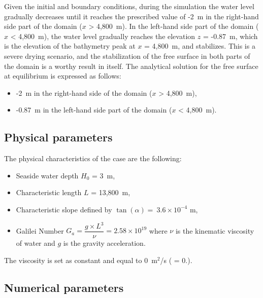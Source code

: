 Given the initial and boundary conditions, during the simulation
the water level gradually decreases until it reaches the prescribed value of -2~m
in the right-hand
side part of the domain ($x$ > 4,800~m). In the left-hand side
part of the domain ($x$ < 4,800~m), the water level gradually reaches the
elevation $z$ = -0.87~m, which
is the elevation of the bathymetry peak at $x$ = 4,800~m, and stabilizes.
This is a severe drying scenario,
and the stabilization of the free surface in both parts of the domain is a
worthy result in itself.
The analytical solution for the free surface at equilibrium is expressed as
follows:
\begin{itemize}
\item -2~m in the right-hand side of the domain ($x$ > 4,800~m),
\item -0.87~m in the left-hand side part of the domain ($x$ < 4,800~m).
\end{itemize}

\subsection{Physical parameters}

The physical characteristics of the case are the following:
\begin{itemize}
  \itemsep0em
\item Seaside water depth $H_0$ = 3~m,
\item Characteristic length $L$ = 13,800~m,
\item Characteristic slope defined by $\tan(\alpha) = ~3.6 \times 10^{-4}$ m,
\item Galilei Number \textbf{$G_a = \dfrac{g \times L^3}{\nu} =  2.58 \times 10^{19}$}
  where $\nu$ is the kinematic viscosity of water and $g$ is the gravity acceleration.
\end{itemize}

The viscosity is set as constant and equal to 0~m$^2$/s
( = 0.).

\subsection{Numerical parameters}

